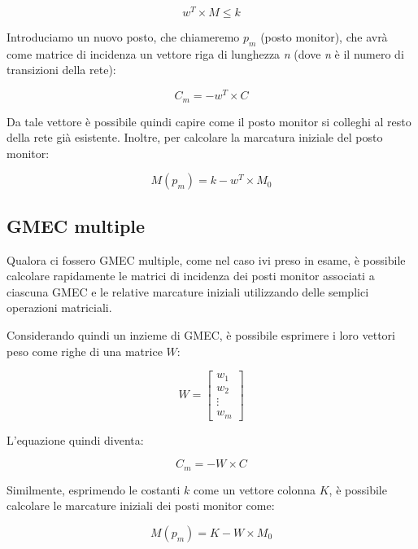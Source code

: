 \begin{equation}
    w^{T} \times M \leq k
\end{equation}

Introduciamo un nuovo posto, che chiameremo $p_{m}$ (posto monitor), che avrà come matrice di incidenza un vettore riga  di lunghezza \textit{n} (dove \textit{n} è il numero di transizioni della rete):

\begin{equation}
    C_{m} = -w^{T} \times C
\end{equation}

Da tale vettore è possibile quindi capire come il posto monitor si colleghi al resto della rete già esistente. Inoltre, per calcolare la marcatura iniziale del posto monitor:

\begin{equation}
    M(p_{m}) = k - w^{T} \times M_{0}
\end{equation}

\subsection{GMEC multiple}
Qualora ci fossero GMEC multiple, come nel caso ivi preso in esame, è possibile calcolare rapidamente le matrici di incidenza dei posti monitor associati a ciascuna GMEC e le relative marcature iniziali utilizzando delle semplici operazioni matriciali.

Considerando quindi un inzieme di GMEC, è possibile esprimere i loro vettori peso come righe di una matrice $W$:

\begin{equation}
    W = \begin{bmatrix}
        w_{1} \\
        w_{2} \\
        \vdots \\
        w_{m}
    \end{bmatrix}
\end{equation}

L'equazione quindi diventa:

\begin{equation}
    C_{m} = -W \times C
    \label{eq:gmec_vect}
\end{equation}

Similmente, esprimendo le costanti $k$ come un vettore colonna $K$, è possibile calcolare le marcature iniziali dei posti monitor come:

\begin{equation}
    M(p_{m}) = K - W \times M_{0}
    \label{eq:gmec_init}
\end{equation}